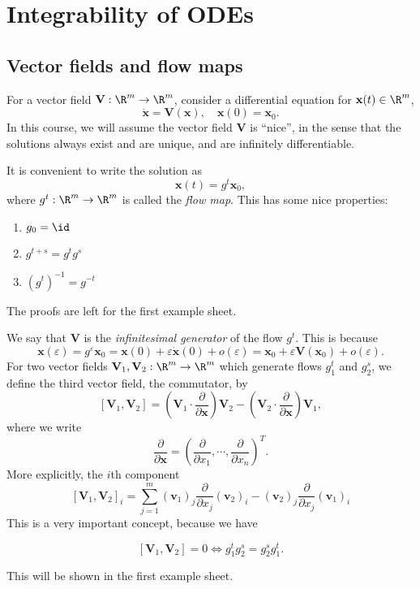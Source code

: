 \documentclass[a4paper]{article}
\begin{document}
\section{Integrability of ODEs}
\subsection{Vector fields and flow maps}
For a vector field $\mathbf{V}: \R^m \to \R^m$, consider a differential equation for $\mathbf{x}(t) \in \R^m$,
\[
  \dot{\mathbf{x}} = \mathbf{V}(\mathbf{x}),\quad \mathbf{x}(0) = \mathbf{x}_0.
\]
In this course, we will assume the vector field $\mathbf{V}$ is ``nice'', in the sense that the solutions always exist and are unique, and are infinitely differentiable.

It is convenient to write the solution as
\[
  \mathbf{x}(t) = g^t \mathbf{x}_0,
\]
where $g^t: \R^m \to \R^m$ is called the \emph{flow map}. This has some nice properties:
\begin{prop}\leavevmode
  \begin{enumerate}
    \item $g_0 = \id$
    \item $g^{t + s} = g^t g^s$
    \item $(g^{t})^{-1} = g^{-t}$
  \end{enumerate}
\end{prop}
The proofs are left for the first example sheet.

We say that $\mathbf{V}$ is the \emph{infinitesimal generator} of the flow $g^t$. This is because
\[
  \mathbf{x}(\varepsilon) = g^\varepsilon \mathbf{x}_0 = \mathbf{x}(0) + \varepsilon \dot{\mathbf{x}}(0) + o(\varepsilon) = \mathbf{x}_0 + \varepsilon \mathbf{V}(\mathbf{x}_0) + o(\varepsilon).
\]
For two vector fields $\mathbf{V}_1, \mathbf{V}_2: \R^m \to \R^m$ which generate flows $g_1^t$ and $g_2^s$, we define the third vector field, the commutator, by
\[
  [\mathbf{V}_1, \mathbf{V}_2] = \left(\mathbf{V}_1 \cdot \frac{\partial}{\partial \mathbf{x}}\right) \mathbf{V}_2 - \left(\mathbf{V}_2 \cdot \frac{\partial}{\partial \mathbf{x}}\right) \mathbf{V}_1,
\]
where we write
\[
  \frac{\partial}{\partial \mathbf{x}} = \left(\frac{\partial}{\partial x_1}, \cdots, \frac{\partial}{\partial x_n}\right)^T.
\]
More explicitly, the $i$th component
\[
  [\mathbf{V}_1, \mathbf{V}_2]_i = \sum_{j = 1}^m (\mathbf{v}_1)_j \frac{\partial}{\partial x_j} (\mathbf{v}_2)_i - (\mathbf{v}_2)_j \frac{\partial}{\partial x_j} (\mathbf{v}_1)_i
\]
This is a very important concept, because we have
\begin{prop}
  \[
    [\mathbf{V}_1, \mathbf{V}_2] = 0 \Leftrightarrow g_1^t g_2^s = g_2^s g_1^t.
  \]
\end{prop}
This will be shown in the first example sheet.
\end{document}
